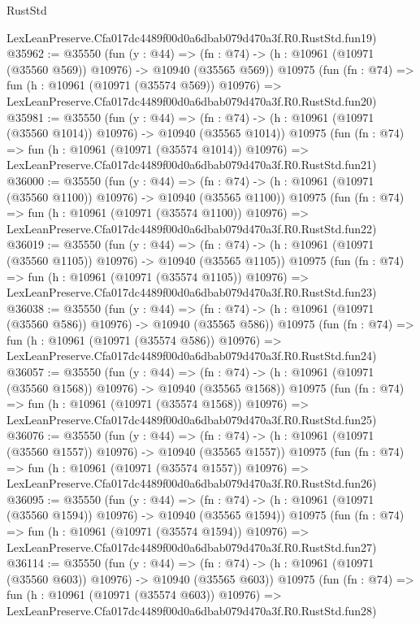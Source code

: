 \begin{lexlean}{RustStd}
\begin{coremodule}
    LexLeanPreserve.Cfa017dc4489f00d0a6dbab079d470a3f.R0.RustStd.fun19)
@35962 := @35550
    (fun (y : @44) =>
    (fn : @74) -> (h : @10961 (@10971 (@35560 @569)) @10976) -> @10940 (@35565 @569))
    @10975
    (fun (fn : @74) =>
    fun (h : @10961 (@10971 (@35574 @569)) @10976) =>
    LexLeanPreserve.Cfa017dc4489f00d0a6dbab079d470a3f.R0.RustStd.fun20)
@35981 := @35550
    (fun (y : @44) =>
    (fn : @74) -> (h : @10961 (@10971 (@35560 @1014)) @10976) -> @10940 (@35565 @1014))
    @10975
    (fun (fn : @74) =>
    fun (h : @10961 (@10971 (@35574 @1014)) @10976) =>
    LexLeanPreserve.Cfa017dc4489f00d0a6dbab079d470a3f.R0.RustStd.fun21)
@36000 := @35550
    (fun (y : @44) =>
    (fn : @74) -> (h : @10961 (@10971 (@35560 @1100)) @10976) -> @10940 (@35565 @1100))
    @10975
    (fun (fn : @74) =>
    fun (h : @10961 (@10971 (@35574 @1100)) @10976) =>
    LexLeanPreserve.Cfa017dc4489f00d0a6dbab079d470a3f.R0.RustStd.fun22)
@36019 := @35550
    (fun (y : @44) =>
    (fn : @74) -> (h : @10961 (@10971 (@35560 @1105)) @10976) -> @10940 (@35565 @1105))
    @10975
    (fun (fn : @74) =>
    fun (h : @10961 (@10971 (@35574 @1105)) @10976) =>
    LexLeanPreserve.Cfa017dc4489f00d0a6dbab079d470a3f.R0.RustStd.fun23)
@36038 := @35550
    (fun (y : @44) =>
    (fn : @74) -> (h : @10961 (@10971 (@35560 @586)) @10976) -> @10940 (@35565 @586))
    @10975
    (fun (fn : @74) =>
    fun (h : @10961 (@10971 (@35574 @586)) @10976) =>
    LexLeanPreserve.Cfa017dc4489f00d0a6dbab079d470a3f.R0.RustStd.fun24)
@36057 := @35550
    (fun (y : @44) =>
    (fn : @74) -> (h : @10961 (@10971 (@35560 @1568)) @10976) -> @10940 (@35565 @1568))
    @10975
    (fun (fn : @74) =>
    fun (h : @10961 (@10971 (@35574 @1568)) @10976) =>
    LexLeanPreserve.Cfa017dc4489f00d0a6dbab079d470a3f.R0.RustStd.fun25)
@36076 := @35550
    (fun (y : @44) =>
    (fn : @74) -> (h : @10961 (@10971 (@35560 @1557)) @10976) -> @10940 (@35565 @1557))
    @10975
    (fun (fn : @74) =>
    fun (h : @10961 (@10971 (@35574 @1557)) @10976) =>
    LexLeanPreserve.Cfa017dc4489f00d0a6dbab079d470a3f.R0.RustStd.fun26)
@36095 := @35550
    (fun (y : @44) =>
    (fn : @74) -> (h : @10961 (@10971 (@35560 @1594)) @10976) -> @10940 (@35565 @1594))
    @10975
    (fun (fn : @74) =>
    fun (h : @10961 (@10971 (@35574 @1594)) @10976) =>
    LexLeanPreserve.Cfa017dc4489f00d0a6dbab079d470a3f.R0.RustStd.fun27)
@36114 := @35550
    (fun (y : @44) =>
    (fn : @74) -> (h : @10961 (@10971 (@35560 @603)) @10976) -> @10940 (@35565 @603))
    @10975
    (fun (fn : @74) =>
    fun (h : @10961 (@10971 (@35574 @603)) @10976) =>
    LexLeanPreserve.Cfa017dc4489f00d0a6dbab079d470a3f.R0.RustStd.fun28)

\end{coremodule}
\end{lexlean}

